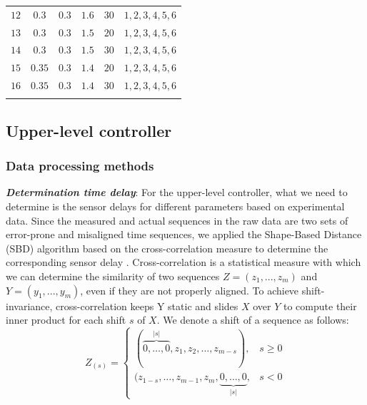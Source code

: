 \documentclass[journal]{IEEEtran}
\begin{document}
\begin{table}
{\begin{tabular}{lccccl}
      $12$             & $0.3$                     & $0.3 $                    & $1.6$                 & $30$          & $1,2,3,4,5,6$                 \\
      $13$             & $0.3$                     & $0.3 $                    & $1.5$                 & $20$          & $1,2,3,4,5,6$                 \\
      $14$             & $0.3$                     & $0.3 $                    & $1.5$                 & $30$          & $1,2,3,4,5,6$                 \\
      $15$             & $0.35$                    & $0.3 $                    & $1.4$                 & $20$          & $1,2,3,4,5,6$                 \\
      $16$             & $0.35$                    & $0.3 $                    & $1.4$                 & $30$          & $1,2,3,4,5,6$                 \\
      \bottomrule
      \label{table1}
    \end{tabular}}
\end{table}











\subsection{Upper-level controller}
\label{Section 3.2}

\subsubsection{Data processing methods}
\label{Section 3.2.1}

\textbf{\emph{Determination time delay}}: For the upper-level controller, what we need to determine is the sensor delays for different parameters based on experimental data. Since the measured and actual sequences in the raw data are two sets of error-prone and misaligned time sequences, we applied the Shape-Based Distance (SBD) algorithm based on the cross-correlation measure to determine the corresponding sensor delay \citep{Paparrizos2015}.
Cross-correlation is a statistical measure with which we can determine the similarity of two sequences $Z = (z_1,..., z_m)$ and $Y = (y_1,..., y_m)$, even if they are not properly aligned. To achieve shift-invariance, cross-correlation keeps Y static and slides $X$ over $Y$ to compute their inner product for each shift $s$ of $X$. We denote a shift of a sequence as follows:
\begin{equation}
  Z_{(s)}= \begin{cases}(\overbrace{0, \ldots, 0}^{|s|}, z_{1}, z_{2}, \ldots, z_{m-s}), & s \geq 0 \\ (z_{1-s}, \ldots, z_{m-1}, z_{m}, \underbrace{0, \ldots, 0}_{|s|}, & s<0\end{cases}
  \label{Eq5}
\end{equation}
\end{document}
